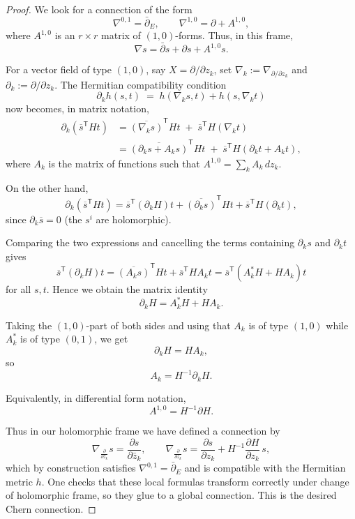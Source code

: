 \documentclass[12pt]{article}
\begin{document}
\begin{proof}
We look for a connection of the form
\[
  \nabla^{0,1} = \bar\partial_E, \qquad
  \nabla^{1,0} = \partial + A^{1,0},
\]
where $A^{1,0}$ is an $r\times r$ matrix of $(1,0)$-forms.  Thus, in
this frame,
\[
  \nabla s = \bar\partial s + \partial s + A^{1,0} s.
\]

For a vector field of type $(1,0)$, say $X=\partial/\partial z_k$, set
$\nabla_k := \nabla_{\partial/\partial z_k}$ and
$\partial_k := \partial/\partial z_k$.
The Hermitian compatibility condition
\[
  \partial_k h(s,t)
   \;=\; h(\nabla_k s,t) + h(s,\nabla_k t)
\]
now becomes, in matrix notation,
\begin{align*}
  \partial_k(\overline{s}^{\mathsf T} H t)
    &= \overline{(\nabla_k s)}^{\mathsf T} H t
       \;+\; \overline{s}^{\mathsf T} H (\nabla_k t) \\
  &= \overline{(\partial_k s + A_k s)}^{\mathsf T} H t
       \;+\; \overline{s}^{\mathsf T} H (\partial_k t + A_k t),
\end{align*}
where $A_k$ is the matrix of functions such that
$A^{1,0} = \sum_k A_k\,dz_k$.

On the other hand,
\[
  \partial_k(\overline{s}^{\mathsf T} H t)
   = \overline{s}^{\mathsf T} (\partial_k H) t
     + \overline{(\partial_k s)}^{\mathsf T} H t
     + \overline{s}^{\mathsf T} H (\partial_k t),
\]
since $\partial_k \overline{s} = 0$ (the $s^i$ are holomorphic).

Comparing the two expressions and cancelling the terms containing
$\partial_k s$ and $\partial_k t$ gives
\[
  \overline{s}^{\mathsf T} (\partial_k H) t
   = \overline{(A_k s)}^{\mathsf T} H t
     + \overline{s}^{\mathsf T} H A_k t
   = \overline{s}^{\mathsf T} (A_k^{*} H + H A_k) t
\]
for all $s,t$.  Hence we obtain the matrix identity
\[
  \partial_k H = A_k^{*} H + H A_k.
\]

Taking the $(1,0)$-part of both sides and using that $A_k$ is of type
$(1,0)$ while $A_k^{*}$ is of type $(0,1)$, we get
\[
  \partial_k H = H A_k,
\]
so
\[
  A_k = H^{-1} \partial_k H.
\]

Equivalently, in differential form notation,
\[
  A^{1,0} = H^{-1} \partial H.
\]

Thus in our holomorphic frame we have defined a connection by
\[
  \nabla_{\frac{\partial}{\partial\bar z_k}} s
     = \frac{\partial s}{\partial\bar z_k}, \qquad
  \nabla_{\frac{\partial}{\partial z_k}} s
     = \frac{\partial s}{\partial z_k}
       + H^{-1}\frac{\partial H}{\partial z_k}\, s,
\]
which by construction satisfies $\nabla^{0,1}=\bar\partial_E$ and is
compatible with the Hermitian metric $h$.  One checks that these local
formulas transform correctly under change of holomorphic frame, so they
glue to a global connection.  This is the desired Chern connection.
    \end{proof}
\end{document}
